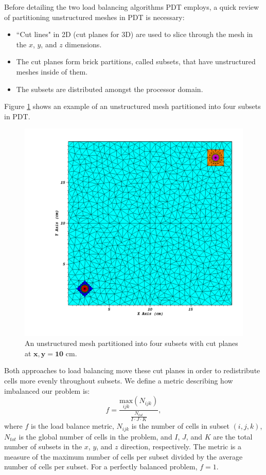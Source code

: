 \documentclass[letterpaper]{mandc2019}
\begin{document}
Before detailing the two load balancing algorithms PDT employs, a quick review of partitioning unstructured meshes in PDT is necessary:
\begin{itemize}\itemsep 1pt \parskip 0pt \parsep 0pt
\item ``Cut lines" in 2D (cut planes for 3D) are used to slice through the mesh in the $x$, $y$, and $z$ dimensions.
\item The cut planes form brick partitions, called subsets, that have unstructured meshes inside of them. 
\item The subsets are distributed amongst the processor domain.
\end{itemize}
Figure \ref{partitioning_example} shows an example of an unstructured mesh partitioned into four subsets in PDT. 

\begin{figure}[!htb]
\centering
\includegraphics[scale=0.4,trim={0.95in 0.64in 0.35in 0.44in},clip]{Figures/partitioning_example.pdf}
\caption{An unstructured mesh partitioned into four subsets with cut planes at $\bm{x,y = 10}$ cm.}
\label{partitioning_example}
\end{figure}
Both approaches to load balancing move these cut planes in order to redistribute cells more evenly throughout subsets. We define a metric describing how imbalanced our problem is:
\begin{equation}
f =\frac{\underset{ijk}{\text{max}}(N_{ijk})}{\frac{N_{tot}}{I\cdot J\cdot K}},
\label{metric_def}
\end{equation}
where $f$ is the load balance metric, $N_{ijk}$ is the number of cells in subset $(i,j,k)$, $N_{tot}$ is the global number of cells in the problem, and $I$, $J$, and $K$ are the total number of subsets in the $x$, $y$, and $z$ direction, respectively. The metric is a measure of the maximum number of cells per subset divided by the average number of cells per subset. For a perfectly balanced problem, $f = 1$.
\end{document}
